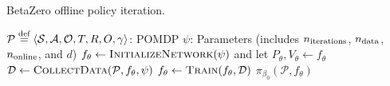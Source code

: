 \begin{algorithm}[H]
    \caption{BetaZero offline policy iteration.}
    \label{alg:betazero}
    \begin{algorithmic}[1]
        \Require $\mathcal{P} \stackrel{\text{def}}{=} \langle \mathcal{S}, \mathcal{A}, \mathcal{O}, T, R, O, \gamma \rangle$: POMDP
        \Require $\psi$: Parameters (includes $n_{\text{\rm iterations}}$, $n_{\text{\rm data}}$, $n_{\text{\rm online}}$, and $d$)
            \State $f_\theta \leftarrow \textproc{InitializeNetwork}(\psi)$ and let $P_\theta, V_\theta \leftarrow f_\theta$ 
                \State $\mathcal{D} \leftarrow \textproc{CollectData}(\mathcal{P}, f_\theta, \psi)$ 
                \State $f_\theta \leftarrow \textproc{Train}(f_\theta, \mathcal{D})$ 
            \EndFor
            \State \Return $\pi_{\beta_0}(\mathcal{P}, f_\theta)$ 
        \EndFunction
    \end{algorithmic}
\end{algorithm}
